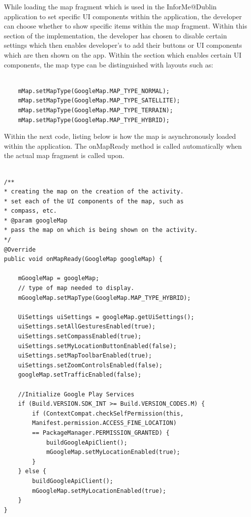 While loading the map fragment which is used in the InforMe@Dublin application to set specific UI components within the application, the developer can choose whether to show specific items within the map fragment. Within this section of the implementation, the developer has chosen to disable certain settings which then enables developer's to add their buttons or UI components which are then shown on the app. Within the section which enables certain UI components, the map type can be distinguished with layouts such as:
\begin{lstlisting}[style=myCustomMatlabStyle, basicstyle=\small, breaklines, caption=Map Types,captionpos=b] 

    mMap.setMapType(GoogleMap.MAP_TYPE_NORMAL);
    mMap.setMapType(GoogleMap.MAP_TYPE_SATELLITE);
    mMap.setMapType(GoogleMap.MAP_TYPE_TERRAIN); 
    mMap.setMapType(GoogleMap.MAP_TYPE_HYBRID);
\end{lstlisting}
Within the next code, listing below is how the map is asynchronously loaded within the application. The onMapReady method is called automatically when the actual map fragment is called upon.
\begin{lstlisting}[style=myCustomMatlabStyle, basicstyle=\small, breaklines, caption=Building the Map,captionpos=b] 

/**
* creating the map on the creation of the activity.
* set each of the UI components of the map, such as
* compass, etc.
* @param googleMap
* pass the map on which is being shown on the activity.
*/
@Override
public void onMapReady(GoogleMap googleMap) {

    mGoogleMap = googleMap;
    // type of map needed to display.
    mGoogleMap.setMapType(GoogleMap.MAP_TYPE_HYBRID);
    
    UiSettings uiSettings = googleMap.getUiSettings();
    uiSettings.setAllGesturesEnabled(true);
    uiSettings.setCompassEnabled(true);
    uiSettings.setMyLocationButtonEnabled(false);
    uiSettings.setMapToolbarEnabled(true);
    uiSettings.setZoomControlsEnabled(false);
    googleMap.setTrafficEnabled(false);
    
    //Initialize Google Play Services
    if (Build.VERSION.SDK_INT >= Build.VERSION_CODES.M) {
        if (ContextCompat.checkSelfPermission(this,
        Manifest.permission.ACCESS_FINE_LOCATION)
        == PackageManager.PERMISSION_GRANTED) {
            buildGoogleApiClient();
            mGoogleMap.setMyLocationEnabled(true);
        }
    } else {
        buildGoogleApiClient();
        mGoogleMap.setMyLocationEnabled(true);
    }
}

\end{lstlisting}

